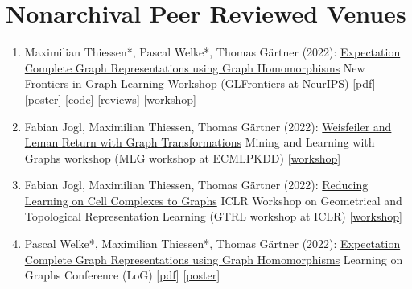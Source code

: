\documentclass{scrartcl}
\begin{document}
\section{Nonarchival Peer Reviewed Venues}
\begin{enumerate}
\conti
\item
\label{thiessen2022expectation}
Maximilian Thiessen*, Pascal Welke*, Thomas Gärtner (2022):\newline
\href{https://pwelke.github.io/}{Expectation Complete Graph Representations using Graph Homomorphisms}\newline
New Frontiers in Graph Learning Workshop (GLFrontiers at NeurIPS)\newline
{\footnotesize
[\href{https://pwelke.github.io/publications/thiessen2022glfrontiers.pdf}{pdf}]
[\href{https://pwelke.github.io/publications/expectation_complete_poster_neurips.pdf}{poster}]
[\href{https://github.com/pwelke/homcount}{code}]
[\href{https://openreview.net/forum?id=Zf-Mn6xzD2B}{reviews}]
[\href{https://glfrontiers.github.io/}{workshop}]
}
\item
\label{jogl2022graph}
Fabian Jogl, Maximilian Thiessen, Thomas Gärtner (2022):\newline
\href{https://pwelke.github.io/}{Weisfeiler and Leman Return with Graph Transformations}\newline
Mining and Learning with Graphs workshop (MLG workshop at ECMLPKDD)\newline
{\footnotesize
[\href{https://mlg-europe.github.io/2022/}{workshop}]
}
\item
\label{jogl2022reducing}
Fabian Jogl, Maximilian Thiessen, Thomas Gärtner (2022):\newline
\href{https://pwelke.github.io/}{Reducing Learning on Cell Complexes to Graphs}\newline
ICLR Workshop on Geometrical and Topological Representation Learning (GTRL workshop at ICLR)\newline
{\footnotesize
[\href{https://gt-rl.github.io/}{workshop}]
}
\item
\label{welke2022expectation}
Pascal Welke*, Maximilian Thiessen*, Thomas Gärtner (2022):\newline
\href{https://pwelke.github.io/}{Expectation Complete Graph Representations using Graph Homomorphisms}\newline
Learning on Graphs Conference (LoG)\newline
{\footnotesize
[\href{https://pwelke.github.io/publications/welke2022log.pdf}{pdf}]
[\href{https://pwelke.github.io/publications/expectation_complete_poster_neurips.pdf}{poster}]
}
\end{enumerate}
\end{document}
